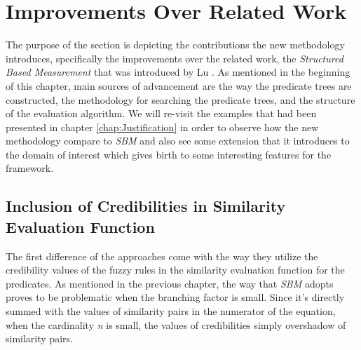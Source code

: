 \section{Improvements Over Related Work}
\label{Improvements}

The purpose of the section is depicting the contributions the new methodology introduces, specifically the improvements over the related work, the \textit{Structured Based Measurement} that was introduced by Lu \cite{Lu}.  As mentioned in the beginning of this chapter, main sources of advancement are the way the predicate trees are constructed, the methodology for searching the predicate trees, and the structure of the evaluation algorithm. We will re-visit the examples that had been presented in chapter \ref{chap:Justification} in order to observe how the new methodology compare to \textit{SBM} and also see some extension that it introduces to the domain of interest which gives birth to some interesting features for the framework.



\subsection{Inclusion of Credibilities in Similarity Evaluation Function}
\label{cred2}

The first difference of the approaches come with the way they utilize the credibility values of the fuzzy rules in the similarity evaluation function for the predicates. As mentioned in the previous chapter, the way that \textit{SBM} adopts proves to be problematic when the branching factor is small.  Since it's directly summed with the values of similarity pairs in the numerator of the equation, when the cardinality \textit{n} is small, the values of credibilities simply overshadow of similarity pairs.

